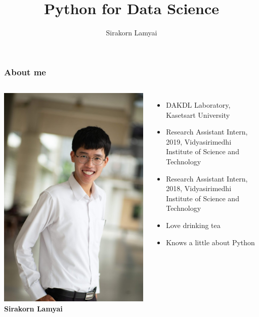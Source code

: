 \documentclass[aspectratio=169]{beamer}
\title{Python for Data Science}
\author{Sirakorn Lamyai}
\institute{Student, Kasetsart U.}
\begin{document}
\maketitle

\begin{frame}
    \frametitle{About me}
    \begin{columns}
            \includegraphics[height=0.8\textheight]{images/sirakorn-1.jpeg}
            {\large \textbf{Sirakorn Lamyai}}
            \begin{itemize}
                \item DAKDL Laboratory, Kasetsart University
                \item Research Assistant Intern, 2019, Vidyasirimedhi Institute of Science and Technology
                \item Research Assistant Intern, 2018, Vidyasirimedhi Institute of Science and Technology
                \item Love drinking tea
                \item Knows a little about Python
            \end{itemize}
    \end{columns}
\end{frame}
\end{document}
